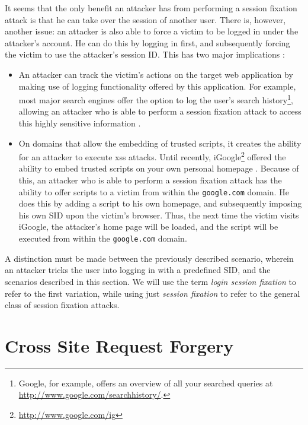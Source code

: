 It seems that the only benefit an attacker has from performing a session fixation attack is that he can take over the session of another user. There is, however, another issue: an attacker is also able to force a victim to be logged in under the attacker's account. He can do this by logging in first, and subsequently forcing the victim to use the attacker's session ID. This has two major implications \cite{Barth2008}:
\begin{itemize}
	\item An attacker can track the victim's actions on the target web application by making use of logging functionality offered by this application. For example, most major search engines offer the option to log the user's search history\footnote{Google, for example, offers an overview of all your searched queries at \url{http://www.google.com/searchhistory/}.}, allowing an attacker who is able to perform a session fixation attack to access this highly sensitive information \cite{Barbaro2006}.
	\item On domains that allow the embedding of trusted scripts, it creates the ability for an attacker to execute \gls{xss} attacks. Until recently, iGoogle\footnote{\url{http://www.google.com/ig}} offered the ability to embed trusted scripts on your own personal homepage \cite{Barth2008}. Because of this, an attacker who is able to perform a session fixation attack has the ability to offer scripts to a victim from within the \texttt{google.com} domain. He does this by adding a script to his own homepage, and subsequently imposing his own SID upon the victim's browser. Thus, the next time the victim visits iGoogle, the attacker's home page will be loaded, and the script will be executed from within the \texttt{google.com} domain.
\end{itemize}
A distinction must be made between the previously described scenario, wherein an attacker tricks the user into logging in with a predefined SID, and the scenarios described in this section. We will use the term \emph{\gls{login session fixation}} to refer to the first variation, while using just \emph{session fixation} to refer to the general class of session fixation attacks.

\section{Cross Site Request Forgery}\label{csrf}

